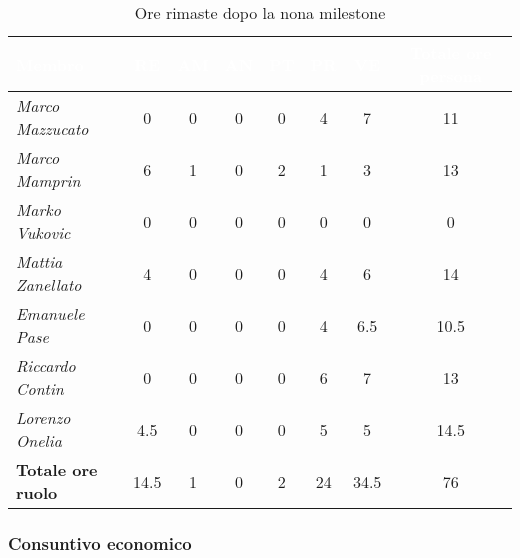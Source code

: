 \begin{table}[H]
    \renewcommand\arraystretch{1.5}
    \centering
    \begin{tabular}{|l|c|c|c|c|c|c|c|}
    \hline
    \rowcolor[HTML]{036400}
    \textcolor{white}{\textbf{Membro}} & \multicolumn{1}{c|}{\textcolor{white}{\textbf{RE}}} & \multicolumn{1}{c|}{\textcolor{white}{\textbf{AM}}} & \multicolumn{1}{c|}{\textcolor{white}{\textbf{AN}}} & \multicolumn{1}{c|}{\textcolor{white}{\textbf{PT}}} & \multicolumn{1}{c|}{\textcolor{white}{\textbf{PR}}} & \multicolumn{1}{c|}{\textcolor{white}{\textbf{VE}}} & \multicolumn{1}{c|}{\textcolor{white}{\textbf{Totale ore persona}}} \\ \hline
    \rowcolor[HTML]{EFEFEF}\textit{Marco Mazzucato}  & 0    & 0    & 0     & 0     & 4   & 7      & 11   \\ \hline
    \rowcolor[HTML]{C0C0C0}\textit{Marco Mamprin}    & 6    & 1    & 0     & 2     & 1   & 3      & 13   \\ \hline
    \rowcolor[HTML]{EFEFEF}\textit{Marko Vukovic}    & 0    & 0    & 0     & 0     & 0   & 0      & 0    \\ \hline
    \rowcolor[HTML]{C0C0C0}\textit{Mattia Zanellato} & 4    & 0    & 0     & 0     & 4   & 6      & 14   \\ \hline
    \rowcolor[HTML]{EFEFEF}\textit{Emanuele Pase}    & 0    & 0    & 0     & 0     & 4   & 6.5    & 10.5 \\ \hline
    \rowcolor[HTML]{C0C0C0}\textit{Riccardo Contin}  & 0    & 0    & 0     & 0     & 6   & 7      & 13   \\ \hline
    \rowcolor[HTML]{EFEFEF}\textit{Lorenzo Onelia}   & 4.5  & 0    & 0     & 0     & 5   & 5      & 14.5 \\ \hline
    \rowcolor[HTML]{C0C0C0}\textbf{Totale ore ruolo} & 14.5 & 1    & 0     & 2     & 24  & 34.5   & 76   \\ \hline
    \end{tabular}
    \caption{Ore rimaste dopo la nona milestone}
\end{table}

\subsubsection{Consuntivo economico}

